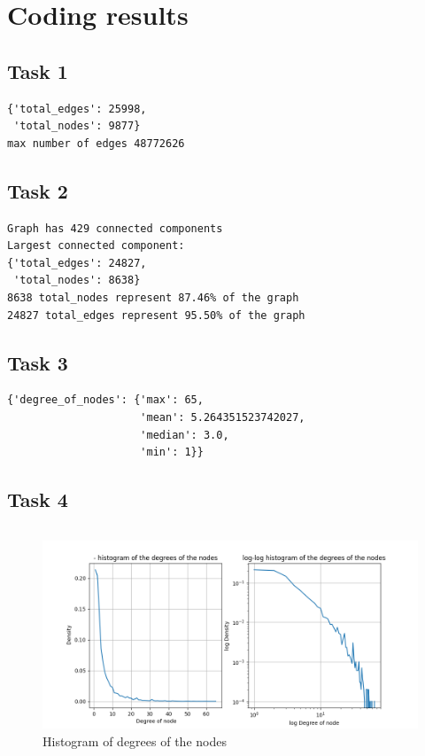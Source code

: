 \documentclass[a4paper]{article}
\begin{document}


\section*{Coding results}

\subsection*{Task 1}
\begin{verbatim}
{'total_edges': 25998,
 'total_nodes': 9877}
max number of edges 48772626
\end{verbatim}


\subsection*{Task 2}
\begin{verbatim}
Graph has 429 connected components
Largest connected component:
{'total_edges': 24827,
 'total_nodes': 8638}
8638 total_nodes represent 87.46% of the graph
24827 total_edges represent 95.50% of the graph
\end{verbatim}


\subsection*{Task 3}
\begin{verbatim}
{'degree_of_nodes': {'max': 65,
                     'mean': 5.264351523742027,
                     'median': 3.0,
                     'min': 1}}
\end{verbatim}


\subsection*{Task 4}
\begin{verbatim}
\end{verbatim}\begin{figure}[ht]
        \centering
        \includegraphics[width=.6\textwidth]{figures/histogram_degree_of_nodes.png}
        \caption{Histogram of degrees of the nodes}
\end{figure}
\begin{verbatim}
\end{verbatim}
\end{document}
